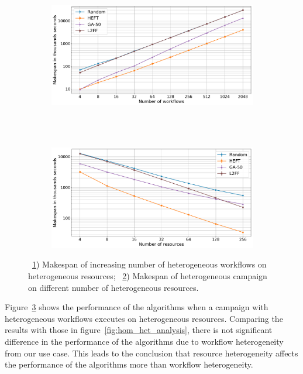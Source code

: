 \begin{figure}[ht!]
    \centering
    \begin{subfigure}[b]{0.75\textwidth}
        \includegraphics[width=.95\textwidth]{figures/campaign/StHeteroCampaigns_4StHeteroResources.pdf}
        \caption{}
        \label{fig:StHeteroCampaigns_4StHeteroResources}
    \end{subfigure}\\
    ~ 
    \begin{subfigure}[b]{0.75\textwidth}
        \includegraphics[width=.95\textwidth]{figures/campaign/StHeteroResources_StHeteroCampaigns.pdf}
        \caption{}
        \label{fig:StHeteroResources_StHeteroCampaigns}
    \end{subfigure}
    \caption{~\ref{fig:StHeteroCampaigns_4StHeteroResources}) Makespan of increasing number of heterogeneous workflows on heterogeneous resources;
        ~\ref{fig:StHeteroResources_StHeteroCampaigns}) Makespan of heterogeneous campaign on different number of heterogeneous resources.}
    \label{fig:heter_analysis}
\end{figure}

Figure~\ref{fig:heter_analysis} shows the performance of the algorithms when a campaign with heterogeneous workflows executes on heterogeneous resources.
Comparing the results with those in figure~\ref{fig:hom_het_analysis}, there is not significant difference in the performance of the algorithms due to workflow heterogeneity from our use case.
This leads to the conclusion that resource heterogeneity affects the performance of the algorithms more than workflow heterogeneity.

